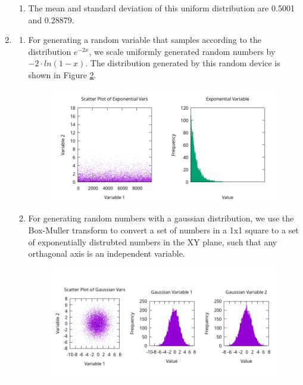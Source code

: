 \documentclass[11 pt]{article}
\begin{document}
\begin{enumerate}
\begin{enumerate}
\item The mean and standard deviation of this uniform distribution are 0.5001 and 0.28879.
\end{enumerate}
\item
\begin{enumerate}
\item For generating a random variable that samples according to the distribution $e^{-2x}$, we scale uniformly generated random numbers by $-2\cdot ln(1-x)$. The distribution generated by this random device is shown in Figure \ref{fig4}.
\begin{figure}[h]
\begin{center}
\label{fig4}
\includegraphics[width=5in]{"plots/q3_a_exponential.png"}
\end{center}
\end{figure}
\item For generating random numbers with a gaussian distribution, we use the Box-Muller transform to convert a set of numbers in a 1x1 square to a set of exponentially distrubted numbers in the XY plane, such that any orthagonal axis is an independent variable.
\begin{figure}[h]
\begin{center}
\label{fig4}
\includegraphics[width=5in]{"plots/q3_b_gaussians.png"}
\end{center}

\end{figure}
\end{enumerate}
\end{enumerate}
\end{document}

